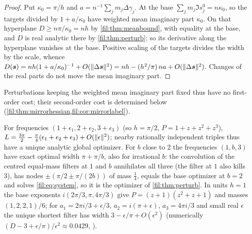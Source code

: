 \begin{proof}
Put $\kappa_0=\pi/h$ and $a=n^{-1}\sum_jm_j\Delta\gamma_j$. At the base $\sum_jm_j\Im s_j^0=n\kappa_0$, so the targets
divided by $1+a/\kappa_0$ have weighted mean imaginary part $\kappa_0$. On that hyperplane $D\ge n\pi/\kappa_0=nh$ by
\cref{fil:thm:meanbound}, with equality at the base, and $D$ is real analytic there by \cref{fil:thm:perturb}; so its
derivative along the hyperplane vanishes at the base. Positive scaling of the targets divides the width by the
scale, whence $D(\boldsymbol s)=nh(1+a/\kappa_0)^{-1}+O(\lVert\Delta\boldsymbol s\rVert^2)=nh-(h^2/\pi)\,na+O(\lVert\Delta\boldsymbol s\rVert^2)$.
Changes of the real parts do not move the mean imaginary part.
\end{proof}

Perturbations keeping the weighted mean imaginary part fixed thus have no first-order cost; their
second-order cost is determined below (\cref{fil:thm:mirrorhessian,fil:cor:mirrorlabel}).

\begin{example}\label{fil:ex:detune}
For frequencies $(1+\epsilon_1,2+\epsilon_2,3+\epsilon_3)$ (so $h=\pi/2$, $P=1+z+z^2+z^3$),
$L=\tfrac{3\pi}2-\tfrac\pi4(\epsilon_1+\epsilon_2+\epsilon_3)+O(\lVert\epsilon\rVert^2)$; nearby rationally
independent triples thus have a unique analytic global optimizer. For $b$ close to $2$ the frequencies
$(1,b,3)$ have exact optimal width $\pi+\pi/b$, also for irrational $b$: the convolution of the centred
equal-mass filters at $1$ and $b$ annihilates all three (the filter at $1$ also kills $3$), has nodes
$\pm(\pi/2\pm\pi/(2b))$ of mass $\tfrac14$, equals the base optimizer at $b=2$ and solves
\eqref{fil:eq:system}, so it is the optimizer of \cref{fil:thm:perturb}. In units $h=1$ the base exponents
$i(2\pi/3,\pi,4\pi/3)$ give $P=(z+1)(z^2+z+1)$ and masses $(1,2,2,1)/6$; for
$a_1=2\pi i/3+\epsilon/3$, $a_2=i(\pi+\epsilon)$, $a_3=4\pi i/3$ and small real $\epsilon$ the unique
shortest filter has width $3-\epsilon/\pi+O(\epsilon^2)$ (numerically $(D-3+\epsilon/\pi)/\epsilon^2\approx0.0429$,
).
\end{example}


